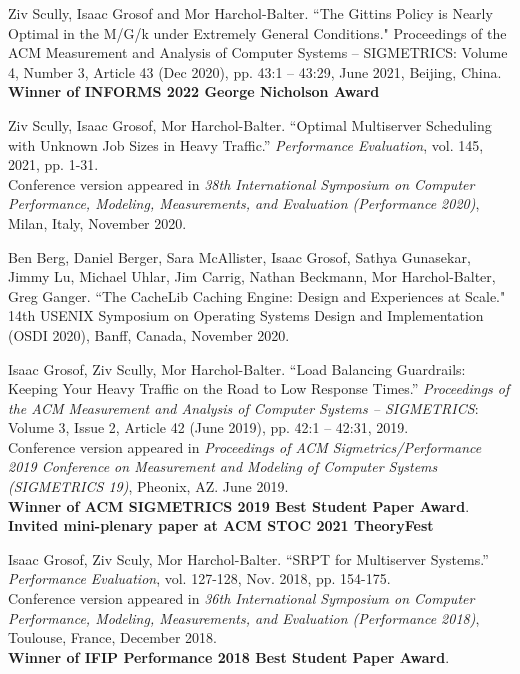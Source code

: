 \documentclass{res}
\begin{document}
\begin{resume}
    Ziv Scully, Isaac Grosof and Mor Harchol-Balter.
    ``The Gittins Policy is Nearly Optimal in the M/G/k under Extremely General Conditions."
    Proceedings of the ACM Measurement and Analysis of Computer Systems -- SIGMETRICS: Volume 4, Number 3, Article 43 (Dec 2020), pp. 43:1 -- 43:29, June 2021, Beijing, China. \\
    \textbf{Winner of INFORMS 2022 George Nicholson Award}

    Ziv Scully, Isaac Grosof, Mor Harchol-Balter.
    ``Optimal Multiserver Scheduling with Unknown Job Sizes in Heavy Traffic.''
    \textit{Performance Evaluation}, vol. 145, 2021, pp. 1-31. \\
    Conference version appeared in
    \textit{38th International Symposium on Computer Performance, Modeling, Measurements, and Evaluation (Performance 2020)},
    Milan, Italy, November 2020.

	Ben Berg, Daniel Berger, Sara McAllister, Isaac Grosof, Sathya Gunasekar, Jimmy Lu, Michael Uhlar,
	Jim Carrig, Nathan Beckmann, Mor Harchol-Balter, Greg Ganger.
	``The CacheLib Caching Engine: Design and Experiences at Scale."
	14th USENIX Symposium on Operating Systems Design and Implementation (OSDI 2020),
	Banff, Canada, November 2020.

    Isaac Grosof, Ziv Scully, Mor Harchol-Balter.
    ``Load Balancing Guardrails: Keeping Your Heavy Traffic on the Road to Low Response Times.''
    \textit{Proceedings of the ACM Measurement and Analysis of Computer Systems -- SIGMETRICS}:
    Volume 3, Issue 2, Article 42 (June 2019), pp. 42:1 -- 42:31, 2019. \\
    Conference version appeared in \textit{Proceedings of ACM Sigmetrics/Performance 2019
    Conference on Measurement and Modeling of Computer Systems (SIGMETRICS 19)}, Pheonix, AZ.
    June 2019.\\
    \textbf{Winner of ACM SIGMETRICS 2019 Best Student Paper Award}. \\
    \textbf{Invited mini-plenary paper at ACM STOC 2021 TheoryFest}

    Isaac Grosof, Ziv Sculy, Mor Harchol-Balter.
    ``SRPT for Multiserver Systems.''
    \textit{Performance Evaluation}, vol. 127-128, Nov. 2018, pp. 154-175. \\
    Conference version appeared in \textit{36th International Symposium on Computer Performance, Modeling, Measurements, and Evaluation (Performance 2018)}, Toulouse, France, December 2018. \\
    \textbf{Winner of IFIP Performance 2018 Best Student Paper Award}.


\end{resume}
\end{document}
